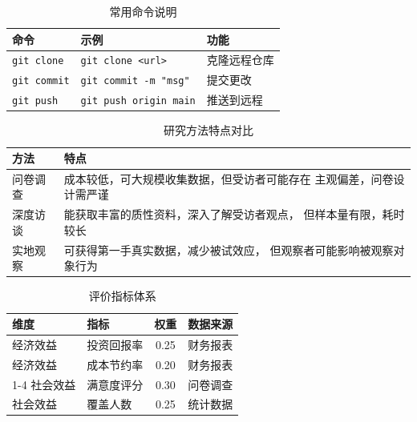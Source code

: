 \begin{table}[H]
  \centering
  \caption{常用命令说明}
  \label{tab:commands}
  \begin{tabular}{lll}
    \toprule
    \textbf{命令} & \textbf{示例} & \textbf{功能} \\
    \midrule
    \texttt{git clone}  & \texttt{git clone <url>}   & 克隆远程仓库 \\
    \texttt{git commit} & \texttt{git commit -m "msg"} & 提交更改 \\
    \texttt{git push}   & \texttt{git push origin main} & 推送到远程 \\
    \bottomrule
  \end{tabular}
\end{table}

\begin{table}[H]
  \centering
  \caption{研究方法特点对比}
  \label{tab:methods}
  \begin{tabular}{lp{8cm}}
    \toprule
    \textbf{方法} & \textbf{特点} \\
    \midrule
    问卷调查 & 成本较低，可大规模收集数据，但受访者可能存在
               主观偏差，问卷设计需严谨 \\
    深度访谈 & 能获取丰富的质性资料，深入了解受访者观点，
               但样本量有限，耗时较长 \\
    实地观察 & 可获得第一手真实数据，减少被试效应，
               但观察者可能影响被观察对象行为 \\
    \bottomrule
  \end{tabular}
\end{table}

\begin{table}[H]
  \centering
  \caption{评价指标体系}
  \label{tab:indicators}
  \begin{tabular}{llcc}
    \toprule
    \textbf{维度} & \textbf{指标} & \textbf{权重} & \textbf{数据来源} \\
    \midrule
    经济效益 & 投资回报率   & 0.25 & 财务报表 \\
    经济效益 & 成本节约率   & 0.20 & 财务报表 \\
    \cmidrule{1-4}
    社会效益 & 满意度评分   & 0.30 & 问卷调查 \\
    社会效益 & 覆盖人数     & 0.25 & 统计数据 \\
    \bottomrule
  \end{tabular}
\end{table}